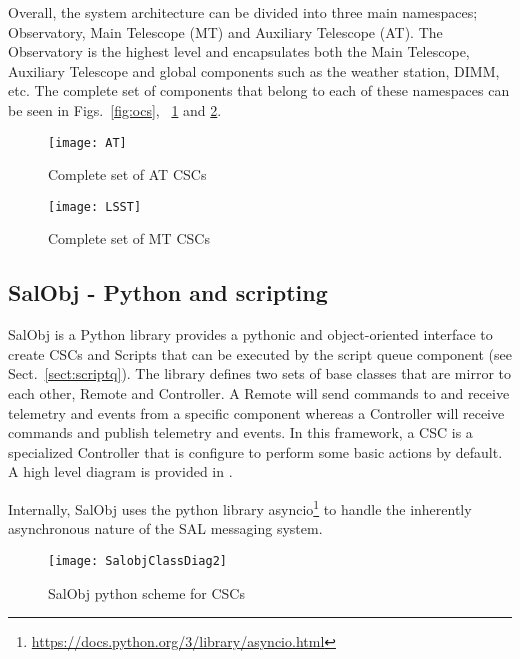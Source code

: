 Overall, the system architecture can be divided into three main namespaces; Observatory, Main Telescope (MT) and Auxiliary Telescope (AT). The Observatory is the highest level and encapsulates both the Main Telescope, Auxiliary Telescope and global components such as the weather station, DIMM, etc. The complete set of components that belong to each of these namespaces can be seen in Figs.~\ref{fig:ocs}, ~\ref{fig:atcscs} and \ref{fig:mtcscs}.

\begin{figure}
\begin{center}
\texttt{[image: AT]}
\caption{Complete set of AT CSCs\label{fig:atcscs}}
\end{center}
\end{figure}

\begin{figure}
\begin{center}
\texttt{[image: LSST]}
\caption{Complete set of MT CSCs\label{fig:mtcscs}}
\end{center}
\end{figure}

\subsection{SalObj - Python and scripting }\label{sect:salobj}
SalObj is a Python library provides a pythonic and object-oriented interface to create CSCs and Scripts that can be executed by the script queue component (see Sect.~\ref{sect:scriptq}). The library defines two sets of base classes that are mirror to each other, Remote and Controller. A Remote will send commands to and receive telemetry and events from a specific component whereas a Controller will receive commands and publish telemetry and events. In this framework, a CSC is a specialized Controller that is configure to perform some basic actions by default. A high level diagram is provided in .

Internally, SalObj uses the python library asyncio\footnote{\url{https://docs.python.org/3/library/asyncio.html}} to handle the inherently asynchronous nature of the SAL messaging system. 

\begin{figure}
\begin{center}
\texttt{[image: SalobjClassDiag2]}
\caption{SalObj python scheme for  CSCs\label{fig:salobj}}
\end{center}
\end{figure}

